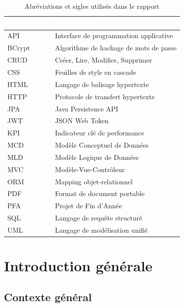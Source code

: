 \documentclass[11pt,a4paper,oneside]{report}
\newcommand{\tabhead}[1]{\textcolor{white}{\textbf{#1}}}
\begin{document}
\begin{table}[H]
\centering
\caption{Abréviations et sigles utilisés dans le rapport}
\label{tab:abbreviations}
\begin{tabular}{@{}ll@{}}
    \rowcolors{2}{AmanaBeige!40}{white}
    \rowcolor{AmanaBrown}
    \tabhead{Abréviation} & \tabhead{Signification} \\
    \midrule
    API     & Interface de programmation applicative \\
    BCrypt  & Algorithme de hachage de mots de passe \\
    CRUD    & Créer, Lire, Modifier, Supprimer \\
    CSS     & Feuilles de style en cascade \\
    HTML    & Langage de balisage hypertexte \\
    HTTP    & Protocole de transfert hypertexte \\
    JPA     & Java Persistence API \\
    JWT     & JSON Web Token \\
    KPI     & Indicateur clé de performance \\
    MCD     & Modèle Conceptuel de Données \\
    MLD     & Modèle Logique de Données \\
    MVC     & Modèle-Vue-Contrôleur \\
    ORM     & Mapping objet-relationnel \\
    PDF     & Format de document portable \\
    PFA     & Projet de Fin d'Année \\
    SQL     & Langage de requête structuré \\
    UML     & Langage de modélisation unifié \\
    \bottomrule
\end{tabular}
\end{table}

\clearpage
{}
\setcounter{page}{1}
\chapter*{Introduction générale}
\label{ch:intro}
\setcounter{section}{0}
\renewcommand{\thesection}{\arabic{section}}

\section{Contexte général}
\end{document}
